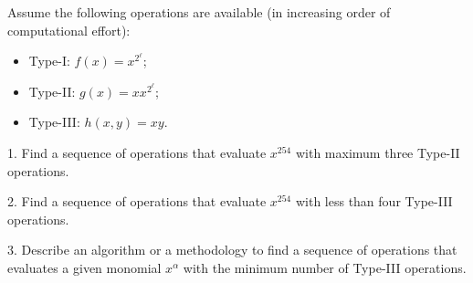 \documentclass{article}
\begin{document}
Assume the following operations are available (in increasing order of computational effort):
\begin{itemize}
  \item Type-I: $f(x)=x^{2^\ell}$;
  \item Type-II: $g(x)=xx^{2^\ell}$;
  \item Type-III: $h(x,y)=xy$.
\end{itemize}


1. Find a sequence of operations that evaluate $x^{254}$ with maximum three Type-II operations.

2. Find a sequence of operations that evaluate $x^{254}$ with less than four Type-III operations.

3. Describe an algorithm or a methodology to find a sequence of operations that evaluates a given monomial $x^{\alpha}$ with the minimum number of Type-III
operations.

\printbibliography
\end{document}
